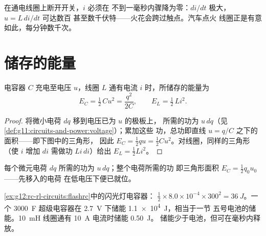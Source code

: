 \begin{remark}[断开开关时的火花]\label{rem:g12:rc-rl-circuits:spark}
在通电线圈上断开开关，$i$ 必须在
不到一毫秒内骤降为零：$di/dt$ 极大，$u = L\,di/dt$ 可达数百
甚至数千伏特——火花会跨过触点。汽车点火
线圈正是有意如此，每分钟数千次。
\end{remark}

\section{储存的能量}

\begin{proposition}[电容器中的能量与线圈中的能量]\label{prop:g12:rc-rl-circuits:energy}
电容器 $C$ 充电至电压 $u$，线圈 $L$ 通有电流
$i$ 时，所储存的能量为
\[
E_C = \tfrac12\,C u^2 = \frac{q^2}{2C},
\qquad
E_L = \tfrac12\,L i^2 .
\]
\end{proposition}

\begin{proof}
将微小电荷 $dq$ 移到电压已为 $u$ 的极板上，
所需的功为 $u\,dq$（见\cref{def:g11:circuits-and-power:voltage}）；累加这些
功，总功即直线 $u = q/C$ 之下的面积——即下图中的三角形，
因此 $E_C = \tfrac12 qu = \tfrac12 Cu^2$。对线圈，同样的三角形
（使 $i$ 增加 $di$ 需做功 $Li\,di$）给出
$E_L = \tfrac12 Li^2$。
\end{proof}

\begin{omfigure}

{\small 每个微元电荷 $dq$ 所需的功为 $u\,dq$；整个电荷所需的功
即三角形面积 $E_C = \tfrac12 q_0 u_0$——先移入的电荷
在低电压下便已就位。}
\end{omfigure}

\begin{example}[能量的数量级]\label{ex:g12:rc-rl-circuits:energies}
\cref{ex:g12:rc-rl-circuits:flashrc}中的闪光灯电容器：
$\tfrac12 \times 8.0\times10^{-4} \times 300^2 = \qty{36}{J}$。一个
\qty{3000}{F} 超级电容器在 \qty{2.7}{V} 下储能 \qty{1.1e4}{J}，相当于一节
五号电池的储能。\qty{10}{mH} 线圈通有 \qty{10}{A} 电流时储能 \qty{0.50}{J}。
储能少于电池，但可在毫秒内释放。
\end{example}

